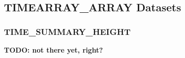 \documentclass[a4paper,11pt,pdftex,twoside]{scrartcl}
\renewcommand{\bf}{\normalfont \bfseries}
\begin{document}
{{{\subsection{TIMEARRAY\_ARRAY Datasets}

\subsubsection{TIME\_SUMMARY\_HEIGHT}
\label{subsec_time_summary_height}

{\bf TODO: not there yet, right?}

%
%
}}}
\end{document}
